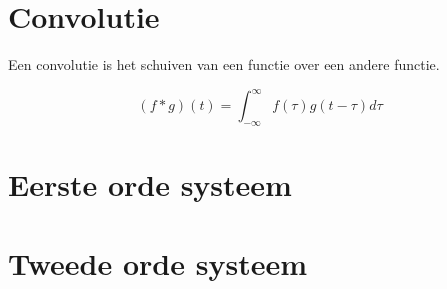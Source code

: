 \section{Convolutie}
Een convolutie is het schuiven van een functie over een andere functie.

\begin{equation}
    (f * g)(t) = \int_{-\infty}^{\infty} f(\tau) g(t-\tau) d\tau
\end{equation}




\section{Eerste orde systeem}

\section{Tweede orde systeem}




